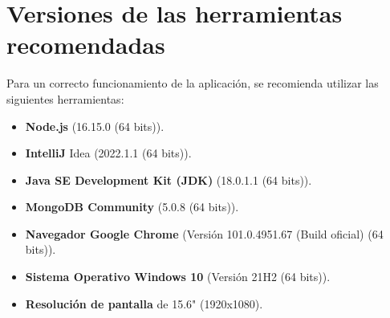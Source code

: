 \section{Versiones de las herramientas recomendadas}

Para un correcto funcionamiento de la aplicación, se recomienda utilizar las siguientes herramientas:
\begin{itemize}
\item {\bf Node.js} (16.15.0 (64 bits)).
\item {\bf IntelliJ} Idea (2022.1.1 (64 bits)).
\item {\bf Java SE Development Kit (JDK)} (18.0.1.1 (64 bits)).
\item {\bf MongoDB Community} (5.0.8 (64 bits)).
\item {\bf Navegador Google Chrome} (Versión 101.0.4951.67 (Build oficial) (64 bits)).
\item {\bf Sistema Operativo Windows 10} (Versión 21H2 (64 bits)).
\item {\bf Resolución de pantalla} de 15.6" (1920x1080).
\end{itemize}
